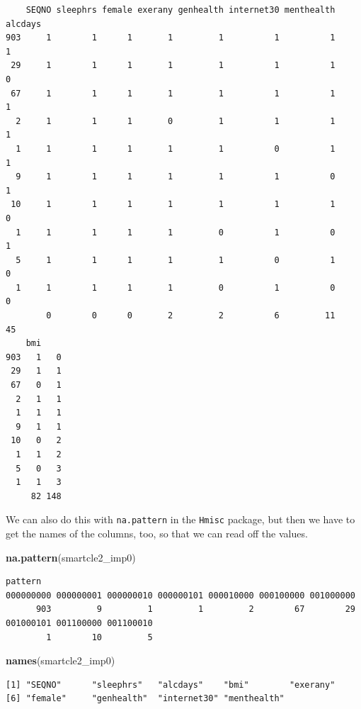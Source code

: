 \documentclass[]{book}
\newenvironment{Shaded}{\begin{snugshade}}{\end{snugshade}}
\newcommand{\KeywordTok}[1]{\textcolor[rgb]{0.13,0.29,0.53}{\textbf{#1}}}
\newcommand{\NormalTok}[1]{#1}
\theoremstyle{definition}
\theoremstyle{definition}
\theoremstyle{definition}
\theoremstyle{remark}
\begin{document}
\begin{verbatim}
    SEQNO sleephrs female exerany genhealth internet30 menthealth alcdays
903     1        1      1       1         1          1          1       1
 29     1        1      1       1         1          1          1       0
 67     1        1      1       1         1          1          1       1
  2     1        1      1       0         1          1          1       1
  1     1        1      1       1         1          0          1       1
  9     1        1      1       1         1          1          0       1
 10     1        1      1       1         1          1          1       0
  1     1        1      1       1         0          1          0       1
  5     1        1      1       1         1          0          1       0
  1     1        1      1       1         0          1          0       0
        0        0      0       2         2          6         11      45
    bmi    
903   1   0
 29   1   1
 67   0   1
  2   1   1
  1   1   1
  9   1   1
 10   0   2
  1   1   2
  5   0   3
  1   1   3
     82 148
\end{verbatim}

We can also do this with \texttt{na.pattern} in the \texttt{Hmisc}
package, but then we have to get the names of the columns, too, so that
we can read off the values.

\begin{Shaded}
\begin{Highlighting}[]
\KeywordTok{na.pattern}\NormalTok{(smartcle2_imp0)}
\end{Highlighting}
\end{Shaded}

\begin{verbatim}
pattern
000000000 000000001 000000010 000000101 000010000 000100000 001000000 
      903         9         1         1         2        67        29 
001000101 001100000 001100010 
        1        10         5 
\end{verbatim}

\begin{Shaded}
\begin{Highlighting}[]
\KeywordTok{names}\NormalTok{(smartcle2_imp0)}
\end{Highlighting}
\end{Shaded}

\begin{verbatim}
[1] "SEQNO"      "sleephrs"   "alcdays"    "bmi"        "exerany"   
[6] "female"     "genhealth"  "internet30" "menthealth"
\end{verbatim}
\end{document}

